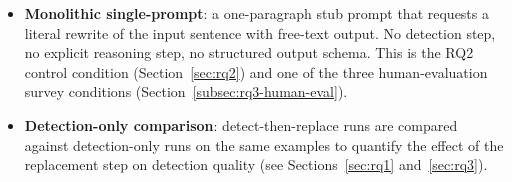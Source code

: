 \begin{itemize}
    \item \textbf{Monolithic single-prompt}: a one-paragraph stub prompt that requests a literal rewrite of the input sentence with free-text output. No detection step, no explicit reasoning step, no structured output schema. This is the RQ2 control condition (Section~\ref{sec:rq2}) and one of the three human-evaluation survey conditions (Section~\ref{subsec:rq3-human-eval}).
    \item \textbf{Detection-only comparison}: detect-then-replace runs are compared against detection-only runs on the same examples to quantify the effect of the replacement step on detection quality (see Sections~\ref{sec:rq1} and~\ref{sec:rq3}).
\end{itemize}

